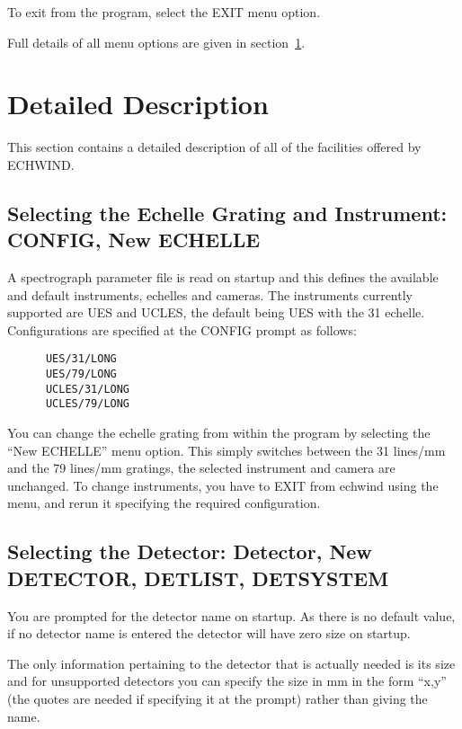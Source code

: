 \documentclass[11pt]{article}
\begin{document}
To exit from the program, select the EXIT menu option.

Full details of all menu options are given in
section~\ref{Detailed Description}.

\section{Detailed Description}
\label{Detailed Description}

This section contains a detailed description of all of the facilities offered
by ECHWIND.

\subsection{Selecting the Echelle Grating and Instrument: CONFIG, New ECHELLE}

A spectrograph parameter file is read on startup and this
defines the available and default instruments, echelles and cameras.
The instruments currently supported are UES and UCLES, the default being
UES with the 31 echelle. Configurations are specified at the CONFIG prompt
as follows:

\begin{verbatim}
      UES/31/LONG
      UES/79/LONG
      UCLES/31/LONG
      UCLES/79/LONG
\end{verbatim}

You can change the echelle grating from within the program by selecting the
``New ECHELLE'' menu option. This simply switches between the 31 lines/mm and
the 79 lines/mm gratings, the selected instrument and camera are unchanged.
To change instruments, you have to EXIT from echwind using the menu, and
rerun it specifying the required configuration.

\subsection{Selecting the Detector: Detector, New DETECTOR, DETLIST, DETSYSTEM}

You are prompted for the detector name on startup. As there is no default
value, if no detector name is entered the detector will have zero size on
startup.

The only information pertaining to the detector that is actually needed is its
size and for unsupported detectors you can specify the size in mm in the form
``x,y'' (the quotes are needed if specifying it at the prompt) rather
than giving the name.
\end{document}
